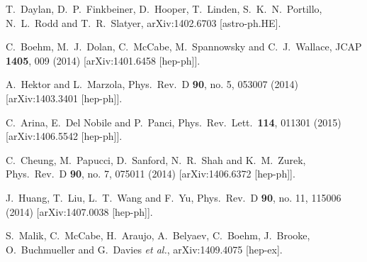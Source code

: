 \documentclass[preprintnumbers,superscriptaddress,nofootinbib,aps,prd,floatfix]{revtex4}
\begin{document}
\begin{thebibliography}{99}
  
  T.~Daylan, D.~P.~Finkbeiner, D.~Hooper, T.~Linden, S.~K.~N.~Portillo, N.~L.~Rodd and T.~R.~Slatyer,
  arXiv:1402.6703 [astro-ph.HE].

  C.~Boehm, M.~J.~Dolan, C.~McCabe, M.~Spannowsky and C.~J.~Wallace,
  JCAP {\bf 1405}, 009 (2014)
  [arXiv:1401.6458 [hep-ph]].

  A.~Hektor and L.~Marzola,
  Phys.\ Rev.\ D {\bf 90}, no. 5, 053007 (2014)
  [arXiv:1403.3401 [hep-ph]].
   
  C.~Arina, E.~Del Nobile and P.~Panci,
  Phys.\ Rev.\ Lett.\  {\bf 114}, 011301 (2015)
  [arXiv:1406.5542 [hep-ph]].


  C.~Cheung, M.~Papucci, D.~Sanford, N.~R.~Shah and K.~M.~Zurek,
  Phys.\ Rev.\ D {\bf 90}, no. 7, 075011 (2014)
  [arXiv:1406.6372 [hep-ph]].



  J.~Huang, T.~Liu, L.~T.~Wang and F.~Yu,
  Phys.\ Rev.\ D {\bf 90}, no. 11, 115006 (2014)
  [arXiv:1407.0038 [hep-ph]].


  S.~Malik, C.~McCabe, H.~Araujo, A.~Belyaev, C.~Boehm, J.~Brooke, O.~Buchmueller and G.~Davies {\it et al.},
  arXiv:1409.4075 [hep-ex].


\end{thebibliography}
\end{document}

